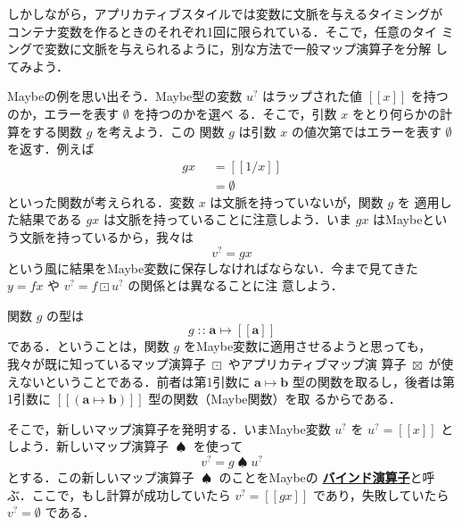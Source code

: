 \documentclass[a5paper,twoside,fleqn,draft]{jsbook}
\newcommand{\TK}[1]{\mask{\textbf{TK:}~#1}{C}}
\def\[{[\![}
\def\]{]\!]}
\newcommand{\keyword}[1]{{\underline{\textbf{#1}}}}
\newcommand{\mKeyword}[1]{\mathsf{#1}}
\newcommand{\mOtherwiseKeyword}{\mKeyword{otherwise}}
\DeclareMathOperator{\mOtherwise}{\mOtherwiseKeyword}
\newcommand{\mNothing}{\emptyset}
\DeclareMathOperator{\mAppMapMaybe}{\boxtimes}
\DeclareMathOperator{\mBindMaybe}{\spadesuit}
\DeclareMathOperator{\mIn}{{:\!:}}
\DeclareMathOperator{\mMapMaybe}{\boxdot}
\DeclareMathOperator{\mMapsTo}{\mapsto}
\newcommand{\mType}[1]{\mathbf{#1}} %
\newcommand{\mA}{\mType{a}}
\newcommand{\mB}{\mType{b}}
\newcommand{\mTypeAssemble}[2]{{}^{\mType{#1}}\[\mType{#2}\]}
\newcommand{\mMaybeType}[1]{\[\mType{#1}\]}%
\newcommand{\mValueConstructor}[1]{\mathrm{#1}}
\newcommand{\mValueWith}[2]{{}^\mValueConstructor{#1}\[#2\]}
\newcommand{\mJustWith}[1]{\[#1\]}%
\newcommand{\mMaybe}[1]{{#1}^?}
\newcommand{\mGuard}[1]{\mathop{\mid_{#1}}}
\newcommand{\mProjEXP}[2]{#1\mMapsTo#2} %
\begin{document}
しかしながら，アプリカティブスタイルでは変数に文脈を与えるタイミングが
コンテナ変数を作るときのそれぞれ1回に限られている．そこで，任意のタイ
ミングで変数に文脈を与えられるように，別な方法で一般マップ演算子を分解
してみよう．

Maybeの例を思い出そう．Maybe型の変数 $\mMaybe{u}$ はラップされた値
$\mJustWith{x}$ を持つのか，エラーを表す $\mNothing$ を持つのかを選べ
る．そこで，引数 $x$ をとり何らかの計算をする関数 $g$ を考えよう．この
関数 $g$ は引数 $x$ の値次第ではエラーを表す $\mNothing$ を返す．例えば
\begin{equation}
  \begin{aligned}
    gx&\mGuard{x\neq0}=\mJustWith{1/x}\\
    &\mGuard{\mOtherwise}=\mNothing
  \end{aligned}
\end{equation}
といった関数が考えられる．変数 $x$ は文脈を持っていないが，関数 $g$ を
適用した結果である $gx$ は文脈を持っていることに注意しよう．いま $gx$
はMaybeという文脈を持っているから，我々は
\begin{equation}
\mMaybe{v}=gx
\end{equation}
という風に結果をMaybe変数に保存しなければならない．今まで見てきた
$y=fx$ や $\mMaybe{v}=f\mMapMaybe\mMaybe{u}$ の関係とは異なることに注
意しよう．

\TK{Poor flow.}

関数 $g$ の型は
\begin{equation}
  g\mIn\mProjEXP{\mA }{\mMaybeType{a}}
\end{equation}
である．ということは，関数 $g$ をMaybe変数に適用させるようと思っても，
我々が既に知っているマップ演算子 $\mMapMaybe$ やアプリカティブマップ演
算子 $\mAppMapMaybe$ が使えないということである．前者は第1引数に
$\mProjEXP{\mA }{\mB }$ 型の関数を取るし，後者は第1引数に
$\mJustWith{(\mProjEXP{\mA }{\mB })}$ 型の関数（Maybe関数）を取
るからである．


そこで，新しいマップ演算子を発明する．いまMaybe変数 $\mMaybe{u}$ を
$\mMaybe{u}=\mJustWith{x}$ としよう．新しいマップ演算子 $\mBindMaybe$
を使って
\begin{equation}
  \mMaybe{v}=g\mBindMaybe\mMaybe{u}
\end{equation}
とする．この新しいマップ演算子 $\mBindMaybe$ のことをMaybeの
\keyword{バインド演算子}と呼ぶ．ここで，もし計算が成功していたら
$\mMaybe{v}=\mJustWith{gx}$ であり，失敗していたら
$\mMaybe{v}=\mNothing$ である．
\end{document}
